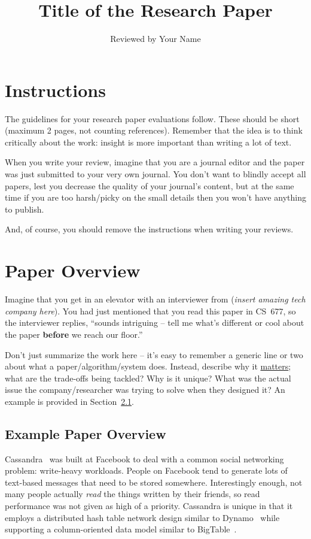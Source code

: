 \documentclass{proc}
\begin{document}
\title{Title of the Research Paper}
\author{Reviewed by Your Name}
\maketitle


\section{Instructions}
The guidelines for your research paper evaluations follow. These should be short (maximum 2 pages, not counting references). Remember that the idea is to think critically about the work: insight is more important than writing a lot of text.

When you write your review, imagine that you are a journal editor and the paper was just submitted to your very own journal. You don't want to blindly accept all papers, lest you decrease the quality of your journal's content, but at the same time if you are too harsh/picky on the small details then you won't have anything to publish.

And, of course, you should remove the instructions when writing your reviews.

\section{Paper Overview}
Imagine that you get in an elevator with an interviewer from (\textit{insert amazing tech company here}). You had just mentioned that you read this paper in CS~677, so the interviewer replies, ``sounds intriguing -- tell me what's different or cool about the paper \textbf{before} we reach our floor.''

Don't just summarize the work here -- it's easy to remember a generic line or two about what a paper/algorithm/system does. Instead, describe why it \underline{matters}; what are the trade-offs being tackled? Why is it unique? What was the actual issue the company/researcher was trying to solve when they designed it? An example is provided in Section~\ref{sec:overview-example}.

\subsection{Example Paper Overview}
\label{sec:overview-example}
Cassandra~\cite{lakshman2010cassandra} was built at Facebook to deal with a common social networking problem: write-heavy workloads. People on Facebook tend to generate lots of text-based messages that need to be stored somewhere. Interestingly enough, not many people actually \emph{read} the things written by their friends, so read performance was not given as high of a priority. Cassandra is unique in that it employs a distributed hash table network design similar to Dynamo~\cite{decandia2007dynamo} while supporting a column-oriented data model similar to BigTable~\cite{chang2008bigtable}.
\end{document}
